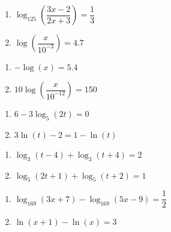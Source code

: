 \documentclass{ximera}
\begin{document}
\begin{multicols}{2}
\begin{enumerate}
\setcounter{enumi}{\value{HW}}

\item $\log_{125} \left(\dfrac{3x-2}{2x+3}\right)=\dfrac{1}{3}$

\item $\log\left(\dfrac{x}{10^{-3}}\right) = 4.7$  \label{sixfourRichterequ}


\setcounter{HW}{\value{enumi}}
\end{enumerate}
\end{multicols}


\begin{multicols}{2}
\begin{enumerate}
\setcounter{enumi}{\value{HW}}

\item $-\log(x) = 5.4$  \label{sixfourpHequ}
\item $10\log\left(\dfrac{x}{10^{-12}}\right) = 150$ \label{sixfourdecibelequ}

\setcounter{HW}{\value{enumi}}
\end{enumerate}
\end{multicols}

\begin{multicols}{2}
\begin{enumerate}
\setcounter{enumi}{\value{HW}}

\item $6-3\log_{5}(2t)=0$
\item $3\ln(t)-2=1-\ln(t)$

\setcounter{HW}{\value{enumi}}
\end{enumerate}
\end{multicols}

\begin{multicols}{2}
\begin{enumerate}
\setcounter{enumi}{\value{HW}}

\item $\log_{3}(t - 4) + \log_{3}(t + 4) = 2$

\item $\log_{5}(2t + 1) + \log_{5}(t + 2) = 1$

\setcounter{HW}{\value{enumi}}
\end{enumerate}
\end{multicols}

\begin{multicols}{2}
\begin{enumerate}
\setcounter{enumi}{\value{HW}}

\item $\log_{169}(3x + 7) - \log_{169}(5x - 9) = \dfrac{1}{2}$

\item $\ln(x+1) - \ln(x) = 3$ 

\setcounter{HW}{\value{enumi}}
\end{enumerate}
\end{multicols}
\end{document}
